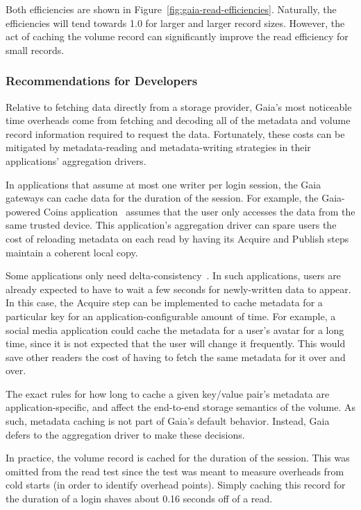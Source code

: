 Both efficiencies are shown in Figure~\ref{fig:gaia-read-efficiencies}.  Naturally,
the efficiencies will tend towards 1.0 for larger and larger record sizes.
However, the act of caching the volume record can significantly improve the read
efficiency for small records.

\subsubsection{Recommendations for Developers}

Relative to fetching data directly from a storage provider, Gaia's most
noticeable time overheads come from fetching and decoding all of the metadata
and volume record information required to request the data.
Fortunately, these costs can be
mitigated by metadata-reading and metadata-writing strategies in
their applications' aggregation drivers.

\hfill \break
{}
\hfill \break

In applications that assume at most one writer per login session,
the Gaia gateways can cache data for the duration of the session.
For example, the Gaia-powered Coins application~\cite{coins} assumes that the
user only accesses the data from the same trusted device.  This application's
aggregation driver can
spare users the cost of reloading metadata on each read by having its Acquire
and Publish steps maintain a coherent local copy.

Some applications only need delta-consistency~\cite{delta-consistency}.  In such
applications, users are already expected to have to wait a few seconds for newly-written data to
appear.  In this case, the Acquire step can be implemented to cache metadata for
a particular key for an application-configurable amount of time.  For example, a
social media application could cache the metadata for a user's avatar for a long
time, since it is not expected that the user will change it frequently.  This
would save other readers the cost of having to fetch the same metadata for it 
over and over.

The exact rules for how long to cache a given key/value pair's metadata are
application-specific, and affect the end-to-end storage semantics of the volume.
As such, metadata caching is not part of Gaia's default
behavior.  Instead, Gaia defers to the aggregation driver to make these
decisions.

In practice, the volume record is cached for the duration of the session.  This
was omitted from the read test since the test was meant to
measure overheads from cold starts (in order to identify overhead points).
Simply caching this record for the duration
of a login shaves about 0.16 seconds off of a read.

